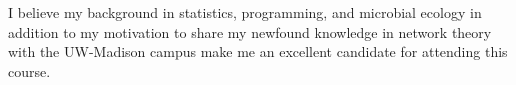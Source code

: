 \documentclass[14pt, letterpaper]{awesome-cv}
\begin{document}
\begin{cvletter}
	I believe my background in statistics, programming, and microbial ecology in addition to my motivation to share my newfound knowledge in network theory with the UW-Madison campus make me an excellent candidate for attending this course. 


\end{cvletter}


\makeletterclosing
\end{document}
